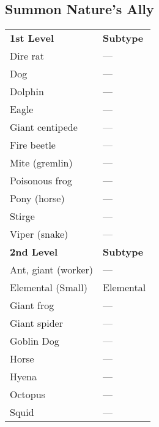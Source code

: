 \subsection{Summon Nature's Ally}
\begin{xtabular}{ll}
\textbf{1st Level}                            & \textbf{Subtype} \\
Dire rat                                      & ---                \\
Dog                                           & ---                \\
Dolphin                                       & ---                \\
Eagle                                         & ---                \\
Giant centipede                               & ---                \\
Fire beetle                                   & ---                \\
Mite (gremlin)                                & ---                \\
Poisonous frog                                & ---                \\
Pony (horse)                                  & ---                \\
Stirge                                        & ---                \\
Viper (snake)                                 & ---                \\
\textbf{2nd Level}                            & \textbf{Subtype} \\
Ant, giant (worker)                           & ---                \\
Elemental (Small)                             & Elemental        \\
Giant frog                                    & ---                \\
Giant spider                                  & ---                \\
Goblin Dog                                    & ---                \\
Horse                                         & ---                \\
Hyena                                         & ---                \\
Octopus                                       & ---                \\
Squid                                         & ---                \\

\end{xtabular}
